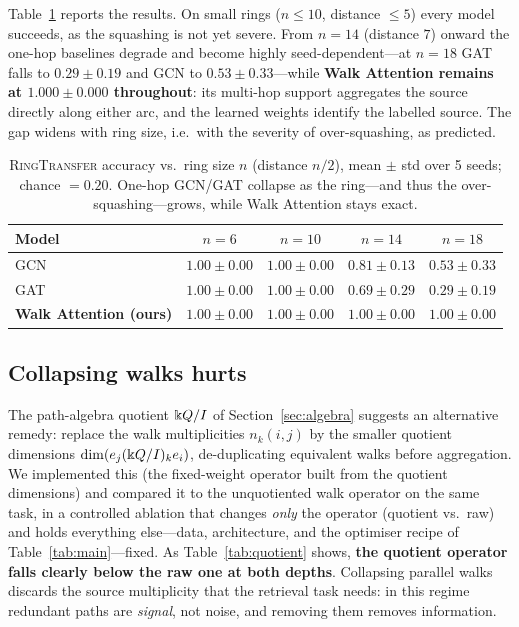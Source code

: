 Table~\ref{tab:ring} reports the results. On small rings ($n\le 10$, distance
$\le 5$) every model succeeds, as the squashing is not yet severe. From $n=14$
(distance $7$) onward the one-hop baselines degrade and become highly
seed-dependent---at $n=18$ GAT falls to $0.29\pm0.19$ and GCN to
$0.53\pm0.33$---while \textbf{Walk Attention remains at $1.000\pm0.000$
throughout}: its multi-hop support aggregates the source directly along either
arc, and the learned weights identify the labelled source. The gap widens with
ring size, i.e.\ with the severity of over-squashing, as predicted.

\begin{table}[t]
\centering
\caption{\textsc{RingTransfer} accuracy vs.\ ring size $n$ (distance $n/2$),
mean $\pm$ std over 5 seeds; chance $=0.20$. One-hop GCN/GAT collapse as the
ring---and thus the over-squashing---grows, while Walk Attention stays exact.}
\label{tab:ring}
\begin{tabular}{lcccc}
\toprule
\textbf{Model} & $n{=}6$ & $n{=}10$ & $n{=}14$ & $n{=}18$ \\
\midrule
GCN                    & $1.00\pm0.00$ & $1.00\pm0.00$ & $0.81\pm0.13$ & $0.53\pm0.33$ \\
GAT                    & $1.00\pm0.00$ & $1.00\pm0.00$ & $0.69\pm0.29$ & $0.29\pm0.19$ \\
\textbf{Walk Attention (ours)} & $\mathbf{1.00\pm0.00}$ & $\mathbf{1.00\pm0.00}$ & $\mathbf{1.00\pm0.00}$ & $\mathbf{1.00\pm0.00}$ \\
\bottomrule
\end{tabular}
\end{table}

\subsection{Collapsing walks hurts}

The path-algebra quotient $\Bbbk Q/I$ of Section~\ref{sec:algebra} suggests an
alternative remedy: replace the walk multiplicities $n_k(i,j)$ by the smaller
quotient dimensions $\dim(e_j(\Bbbk Q/I)_k e_i)$, de-duplicating equivalent walks
before aggregation. We implemented this (the fixed-weight operator built from the
quotient dimensions) and compared it to the unquotiented walk operator on the
same task, in a controlled ablation that changes \emph{only} the operator
(quotient vs.\ raw) and holds everything else---data, architecture, and the
optimiser recipe of Table~\ref{tab:main}---fixed. As Table~\ref{tab:quotient}
shows, \textbf{the quotient operator falls clearly below the raw one at both
depths}. Collapsing parallel walks discards the source multiplicity that the
retrieval task needs: in this regime redundant paths are \emph{signal}, not
noise, and removing them removes information.

